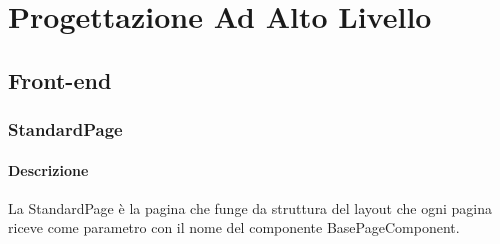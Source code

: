 \section{Progettazione Ad Alto Livello}
\label{sec:ProgettazioneAdAltoLivello}

\subsection{Front-end}
\label{sec:Front-end}
\subsubsection{StandardPage}
\label{sec:StandardPage}
\paragraph{Descrizione}
La StandardPage è la pagina che funge da struttura del layout che ogni pagina riceve come parametro con il nome del componente BasePageComponent.
